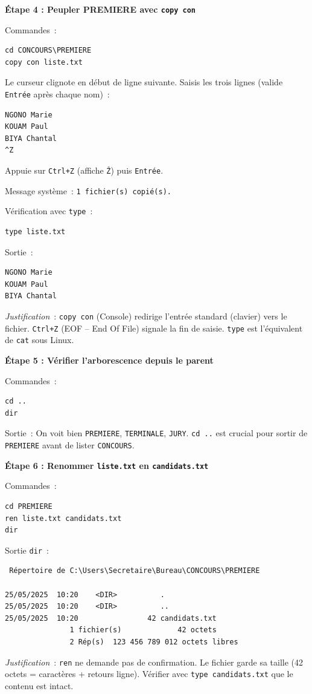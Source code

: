 \documentclass[11pt]{article}
\begin{document}
\begin{exoresolu}
\textbf{Étape 4 : Peupler PREMIERE avec \texttt{copy con}}\par
\noindent
Commandes~:
\begin{lstlisting}
cd CONCOURS\PREMIERE
copy con liste.txt
\end{lstlisting}
\noindent
Le curseur clignote en début de ligne suivante. Saisis les trois lignes (valide \texttt{Entrée} après chaque nom)~:
\begin{lstlisting}
NGONO Marie
KOUAM Paul
BIYA Chantal
^Z
\end{lstlisting}
\noindent
Appuie sur \texttt{Ctrl+Z} (affiche \texttt{\^Z}) puis \texttt{Entrée}.\par
\noindent
Message système~: \texttt{1 fichier(s) copié(s).}\par
\noindent
Vérification avec \texttt{type}~:
\begin{lstlisting}
type liste.txt
\end{lstlisting}
\noindent
Sortie~:
\begin{lstlisting}
NGONO Marie
KOUAM Paul
BIYA Chantal
\end{lstlisting}
\noindent
\emph{Justification}~: \texttt{copy con} (Console) redirige l'entrée standard (clavier) vers le fichier. \texttt{Ctrl+Z} (EOF -- End Of File) signale la fin de saisie. \texttt{type} est l'équivalent de \texttt{cat} sous Linux.

\textbf{Étape 5 : Vérifier l'arborescence depuis le parent}\par
\noindent
Commandes~:
\begin{lstlisting}
cd ..
dir
\end{lstlisting}
\noindent
Sortie~: On voit bien \texttt{PREMIERE}, \texttt{TERMINALE}, \texttt{JURY}. \texttt{cd ..} est crucial pour sortir de \texttt{PREMIERE} avant de lister \texttt{CONCOURS}.

\textbf{Étape 6 : Renommer \texttt{liste.txt} en \texttt{candidats.txt}}\par
\noindent
Commandes~:
\begin{lstlisting}
cd PREMIERE
ren liste.txt candidats.txt
dir
\end{lstlisting}
\noindent
Sortie \texttt{dir}~:
\begin{lstlisting}
 Répertoire de C:\Users\Secretaire\Bureau\CONCOURS\PREMIERE

25/05/2025  10:20    <DIR>          .
25/05/2025  10:20    <DIR>          ..
25/05/2025  10:20                42 candidats.txt
               1 fichier(s)             42 octets
               2 Rép(s)  123 456 789 012 octets libres
\end{lstlisting}
\noindent
\emph{Justification}~: \texttt{ren} ne demande pas de confirmation. Le fichier garde sa taille (42 octets = caractères + retours ligne). Vérifier avec \texttt{type candidats.txt} que le contenu est intact.


\end{exoresolu}
\end{document}
